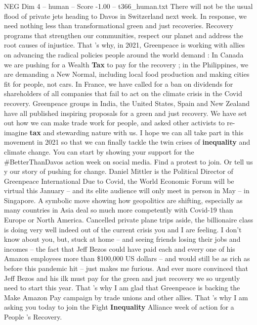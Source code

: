 \begin{textsample}{NEG Dim 4 – human – Score -1.00 – t366\_human.txt}  \label{ex:f4_neg_043}
There will not be the usual flood of private jets heading to Davos in Switzerland next week.
In response, we need nothing less than transformational green and just recoveries.
Recovery programs that strengthen our communities, respect our planet and address the root causes of injustice.
That ’s why, in 2021, Greenpeace is working with allies on advancing the radical policies people around the world demand : In Canada we are pushing for a Wealth \textbf{Tax} to pay for the recovery ; in the Philippines, we are demanding a New Normal, including local food production and making cities fit for people, not cars.
In France, we have called for a ban on dividends for shareholders of all companies that fail to act on the climate crisis in the Covid recovery.
Greenpeace groups in India, the United States, Spain and New Zealand have all published inspiring proposals for a green and just recovery.
We have set out how we can make trade work for people, and asked other activists to re-imagine \textbf{tax} and stewarding nature with us.
I hope we can all take part in this movement in 2021 so that we can finally tackle the twin crises of \textbf{inequality} and climate change.
You can start by showing your support for the \#BetterThanDavos action week on social media.
Find a protest to join.
Or tell us y our story of pushing for change.
Daniel Mittler is the Political Director of Greenpeace International Due to Covid, the World Economic Forum will be virtual this January – and its elite audience will only meet in person in May – in Singapore.
A symbolic move showing how geopolitics are shifting, especially as many countries in Asia deal so much more competently with Covid-19 than Europe or North America.
Cancelled private plane trips aside, the billionaire class is doing very well indeed out of the current crisis you and I are feeling.
I don't know about you, but, stuck at home – and seeing friends losing their jobs and incomes – the fact that Jeff Bezos could have paid each and every one of his Amazon employees more than \$100,000 US dollars – and would still be as rich as before this pandemic hit – just makes me furious.
And ever more convinced that Jeff Bezos and his ilk must pay for the green and just recovery we so urgently need to start this year.
That ’s why I am glad that Greenpeace is backing the Make Amazon Pay campaign by trade unions and other allies.
That ’s why I am asking you today to join the Fight \textbf{Inequality} Alliance week of action for a People ’s Recovery.

\end{textsample}
